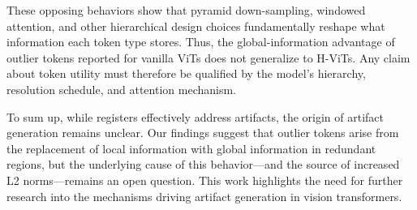 \documentclass[10pt]{article} \usepackage[preprint]{tmlr}
\begin{document}
These opposing behaviors show that pyramid down-sampling, windowed attention, and other hierarchical design choices fundamentally reshape what information each token type stores. Thus, the global-information advantage of outlier tokens reported for vanilla ViTs does not generalize to H-ViTs. Any claim about token utility must therefore be qualified by the model’s hierarchy, resolution schedule, and attention mechanism.


To sum up, while registers effectively address artifacts, the origin of artifact generation remains unclear. Our findings suggest that outlier tokens arise from the replacement of local information with global information in redundant regions, but the underlying cause of this behavior—and the source of increased L2 norms—remains an open question. This work highlights the need for further research into the mechanisms driving artifact generation in vision transformers.

\newpage
\end{document}
